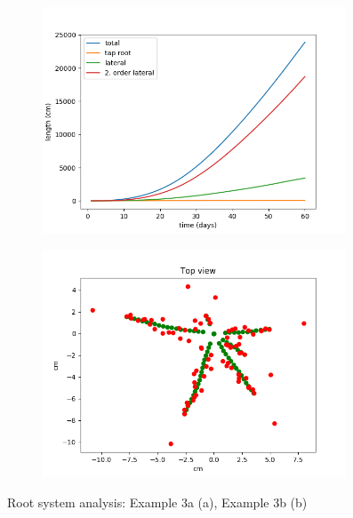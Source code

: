 \documentclass[a4paper]{article}
\begin{document}
\begin{figure}
\begin{subfigure}[c]{0.5\textwidth}
\includegraphics[width=0.99\textwidth]{example_3a.png}
 \label{fig:length}
\end{subfigure}
\begin{subfigure}[c]{0.5\textwidth}
\includegraphics[width=0.99\textwidth]{example_3b.png}
 \label{fig:scatter}
\end{subfigure}
\caption{Root system analysis: Example 3a (a), Example 3b (b)} 
\end{figure}
\end{document}
